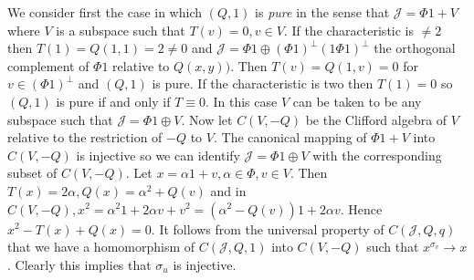 We consider first the case in which $(Q, 1)$ is {\em pure} in the
sense that $\mathscr{J}=\Phi 1+V$ where $V$ is a subspace such that
$T(v)=0,v\in V$. If the characteristic is $\neq 2$ then
$T(1)=Q(1,1)=2\neq 0$ and $\mathscr{J}=\Phi 1\oplus(\Phi
1)^{\bot}(1\Phi 1)^{\bot}$ the orthogonal complement of $\Phi 1$
relative to $Q(x,y))$. Then $T(v)=Q(1,v)=0$ for $v\in (\Phi
1)^{\bot}$ and $(Q,1)$ is pure. If the characteristic is two then
$T(1)=0$ so $(Q,1)$ is pure if and only if $T\equiv 0$. In this case
$V$ can be taken to be any subspace such that $\mathscr{J}=\Phi1\oplus
V$. Now let $C(V,-Q)$ be the Clifford algebra of $V$ relative to the
restriction of $-Q$ to $V$. The canonical mapping of $\Phi 1+ V$ into
$C(V, -Q)$ is injective so we can identify $\mathscr{J}=\Phi 1\oplus
V$ with the corresponding subset of $C(V,-Q)$. Let $x=\alpha
1+v,\alpha \in \Phi,v \in V$. Then $T(x)=2\alpha,
Q(x)=\alpha^{2}+Q(v)$ and in $C(V,-Q), x^{2}=\alpha^{2}1+2\alpha
v+v^{2}=(\alpha^{2}-Q(v))1+2\alpha v$. Hence $x^{2}-T(x)+Q(x)=0$. It
follows from the universal property of $C(\mathscr{J},Q,q)$ that we
have a homomorphism of $C(\mathscr{J},Q,1)$ into $C(V,-Q)$ such that
$x^{\sigma_v}\to x$. Clearly this implies that $\sigma_u$ is
injective.

